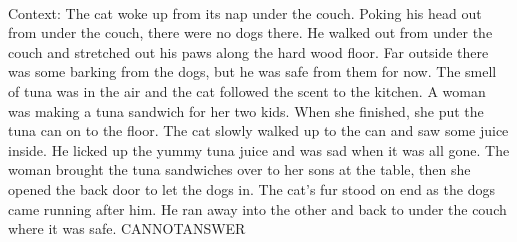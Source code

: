 \documentclass[11pt,a4paper, onecolumn]{article}
\begin{document}
\\ Context: The cat woke up from its nap under the couch. Poking his head out from under the couch, there were no dogs there. He walked out from under the couch and stretched out his paws along the hard wood floor. Far outside there was some barking from the dogs, but he was safe from them for now. The smell of tuna was in the air and the cat followed the scent to the kitchen. A woman was making a tuna sandwich for her two kids. When she finished, she put the tuna can on to the floor. The cat slowly walked up to the can and saw some juice inside. He licked up the yummy tuna juice and was sad when it was all gone. The woman brought the tuna sandwiches over to her sons at the table, then she opened the back door to let the dogs in. The cat's fur stood on end as the dogs came running after him. He ran away into the other and back to under the couch where it was safe. CANNOTANSWER
\end{document}
